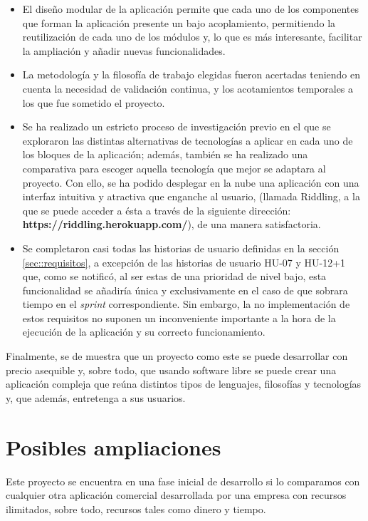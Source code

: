 \begin{itemize}
    \item El diseño modular de la aplicación permite que cada uno de los componentes que forman la aplicación presente un bajo acoplamiento, permitiendo la reutilización de cada uno de los módulos y, lo que es más interesante, facilitar la ampliación y añadir nuevas funcionalidades. 

    \item La metodología y la filosofía de trabajo elegidas fueron acertadas teniendo en cuenta la necesidad de validación continua, y los acotamientos temporales a los que fue sometido el proyecto.

    \item Se ha realizado un estricto proceso de investigación previo en el que se exploraron las distintas alternativas de tecnologías a aplicar en cada uno de los bloques de la aplicación; además, también se ha realizado una comparativa para escoger aquella tecnología que mejor se adaptara al proyecto. Con ello, se ha podido desplegar en la nube una aplicación con una interfaz intuitiva y atractiva que enganche al usuario, (llamada Riddling, a la que se puede acceder a ésta a través de la siguiente dirección: \textbf{https://riddling.herokuapp.com/}), de una manera satisfactoria.

    \item Se completaron casi todas las historias de usuario definidas en la sección \ref{sec::requisitos}, a excepción de las historias de usuario HU-07 y HU-12+1 que, como se notificó, al ser estas de una prioridad de nivel bajo, esta funcionalidad se añadiría única y exclusivamente en el caso de que sobrara tiempo en el \textit{sprint} correspondiente. Sin embargo, la no implementación de estos requisitos no suponen un inconveniente importante a la hora de la ejecución de la aplicación y su correcto funcionamiento. 

\end{itemize}
Finalmente, se de muestra que un proyecto como este se puede desarrollar con precio asequible y, sobre todo, que usando software libre se puede crear una aplicación compleja que reúna distintos tipos de lenguajes, filosofías y tecnologías y, que además, entretenga a sus usuarios.

\section{Posibles ampliaciones}

Este proyecto se encuentra en una fase inicial de desarrollo si lo comparamos con cualquier otra aplicación comercial desarrollada por una empresa con recursos ilimitados, sobre todo, recursos tales como dinero y tiempo.

